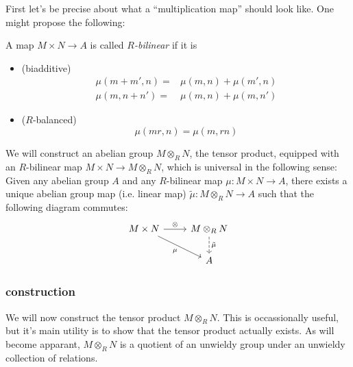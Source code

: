 \documentclass[12pt]{article}
\begin{document}
First let's be precise about what a ``multiplication map'' should look like. One might propose the following:

\begin{definition}
	A map $M\times N\to A$ is called \emph{$R$-bilinear} if it is 
	\begin{itemize}
		\item (biadditive)
			\begin{align*}
				\mu(m+m',n) =& \mu(m,n) + \mu(m',n) \\
				\mu(m,n+n') =& \mu(m,n) + \mu(m,n')
			\end{align*}
		\item ($R$-balanced)
			\begin{equation*}
				\mu(mr,n) = \mu(m,rn)
			\end{equation*}
	\end{itemize}
\end{definition}

We will construct an abelian group $M\otimes_R N$, the tensor product, equipped with an $R$-bilinear map $M\times N\to M\otimes_R N$, which is universal in the following sense: Given any abelian group $A$ and any $R$-bilinear map $\mu:M\times N\to A$, there exists a unique abelian group map (i.e. linear map) $\tilde{\mu}:M\otimes_R N\to A$ such that the following diagram commutes: 
\begin{equation*}
	\begin{tikzcd}
	M\times N \arrow[r, "\otimes"] \arrow[rd, "\mu"'] & M\otimes_R N \arrow[d, "\tilde{\mu}", dashed] \\
													  & A                                            
	\end{tikzcd}
\end{equation*}

\subsubsection{construction} %

We will now construct the tensor product $M\otimes_R N$. This is occassionally useful, but it's main utility is to show that the tensor product actually exists. As will become apparant, $M\otimes_R N$ is a quotient of an unwieldy group under an unwieldy collection of relations.
\end{document}
